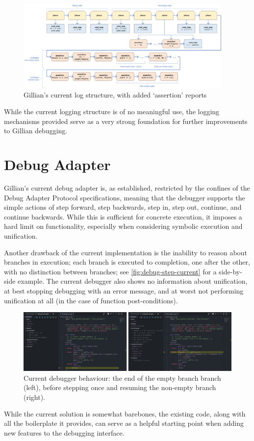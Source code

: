 \begin{figure}
  \center{}
  \includegraphics[width=0.95\textwidth]{img/log-structure-current.png}
  \caption{Gillian's current log structure, with added `assertion' reports}%
  \label{fig:log-structure-current}
\end{figure}

While the current logging structure is of no meaningful use, the logging
mechanisms provided serve as a very strong foundation for further improvements
to Gillian debugging.


\section{Debug Adapter}\label{sec:current:dap}

Gillian's current debug adapter is, as established, restricted by the confines
of the Debug Adapter Protocol specifications, meaning that the debugger supports
the simple actions of step forward, step backwards, step in, step out, continue,
and continue backwards. While this is sufficient for concrete execution, it
imposes a hard limit on functionality, especially when considering symbolic
execution and unification.

Another drawback of the current implementation is the inability to reason
about branches in execution; each branch is executed to completion, one after
the other, with no distinction between branches; see
\autoref{fig:debug-step-current} for a side-by-side example. The current
debugger also shows no information about unification, at best stopping debugging
with an error message, and at worst not performing unification at all (in the
case of function post-conditions).

\begin{figure}
  \center{}
  \includegraphics[width=\textwidth]{img/debug-step-current.png}
  \caption{
    Current debugger behaviour: the end of the empty branch branch (left),
    before stepping once and resuming the non-empty branch (right).}%
  \label{fig:debug-step-current}
\end{figure}

While the current solution is somewhat barebones, the existing code, along with
all the boilerplate it provides, can serve as a helpful starting point when
adding new features to the debugging interface.
